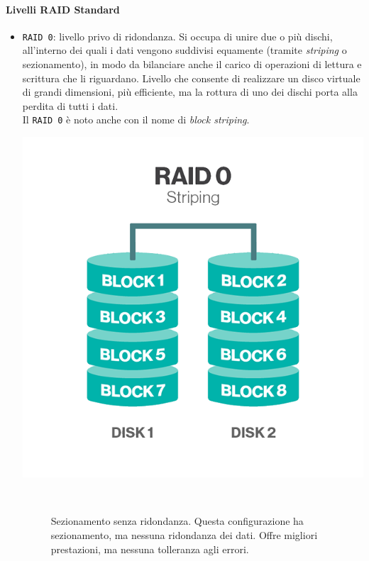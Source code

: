 \paragraph{Livelli RAID Standard}
\begin{itemize}
\item 
\verb"RAID 0": livello privo di ridondanza. Si occupa di unire due o pi\`{u} dischi, all'interno dei quali i dati vengono suddivisi equamente (tramite \textit{striping} o sezionamento), in modo da bilanciare anche il carico di operazioni di lettura e scrittura che li riguardano. Livello che consente di realizzare un disco virtuale di grandi dimensioni, pi\`{u} efficiente, ma la rottura di uno dei dischi porta alla perdita di tutti i dati.\cite{etichetta9} \\
Il \verb"RAID 0" \`{e} noto anche con il nome di \textit{block striping}.\\

\begin{center}
\includegraphics[scale=0.40]{img/raid00.png}
\end{center}
\begin{figure}[htbp]
\caption{Sezionamento senza ridondanza. Questa configurazione ha sezionamento, ma nessuna ridondanza dei dati. Offre migliori prestazioni, ma nessuna tolleranza agli errori.\label{figura1.3}\cite{etichetta9}}\\
\end{figure}


\end{itemize}
